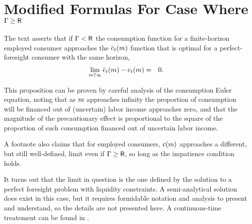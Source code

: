 \documentclass{handout}
\begin{document}
\section{Modified Formulas For Case Where $\Gamma \geq \mathsf{R}$} \label{sec:PGroGEQRfree}

The text asserts that if $\Gamma < \mathsf{R}$ the consumption function for a finite-horizon employed consumer approaches
the $\bar{\mathrm{c}}_{t}(m)$ function that is optimal for a perfect-foresight
consumer with the same horizon,
\begin{eqnarray}
  \lim_{m \uparrow \infty} \bar{\mathrm{c}}_{t}(m) - \mathrm{c}_{t}(m) & = & 0
.
\end{eqnarray}

This proposition can be proven by careful analysis of the consumption Euler equation,
noting that as $m$ approaches infinity the proportion of consumption will
be financed out of (uncertain) labor income approaches zero, and that the magnitude
of the precautionary effect is proportional to the square of the proportion of such
consumption financed out of uncertain labor income.

A footnote also claims that for employed consumers, $\mathrm{c}(m)$
approaches a different, but still well-defined, limit even if $\Gamma
\geq \mathsf{R}$, so long as the impatience condition holds.

It turns out that the limit in question is the one defined by the solution to a
perfect foresight problem with liquidity constraints.  A semi-analytical solution does
exist in this case, but it requires formidable notation and analysis to present and
understand, so the details are not presented here.  A continuous-time treatement
can be found in \cite{parkLiqConstrContinuous}.

\pagebreak

\end{document}
